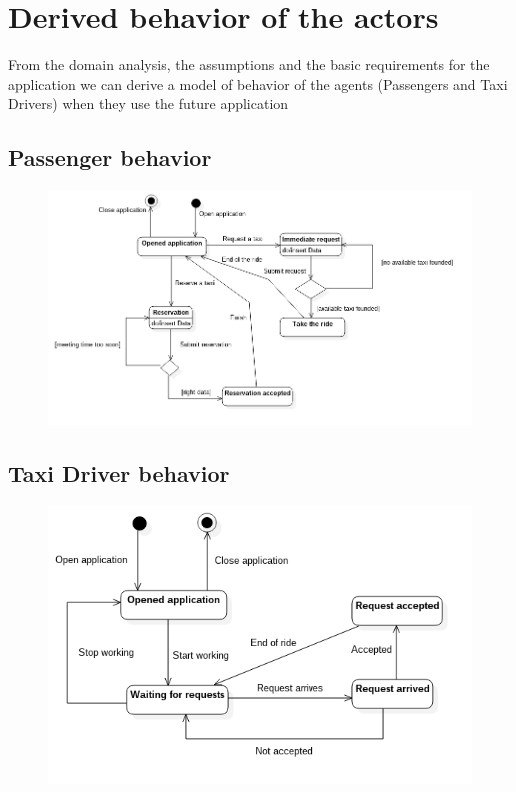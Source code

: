 \section{Derived behavior of the actors}
From the domain analysis, the assumptions and the basic requirements for the application we can derive a model of behavior of the agents (Passengers and Taxi Drivers) when they use the future application
\subsection{Passenger behavior}
\begin{figure}[H]
\centering
\includegraphics[scale=0.5]{Images/statechart_passenger}
\end{figure}
\subsection{Taxi Driver behavior}
\begin{figure}[H]
\centering
\includegraphics[scale=0.5]{Images/statechart_taxiDriver}
\end{figure}